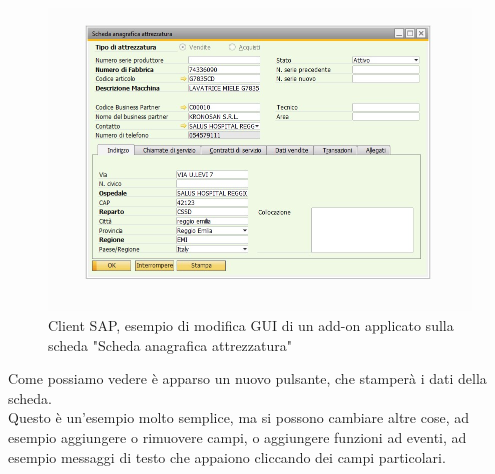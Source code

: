 \pagebreak
\begin{figure}[!h] 
	\centering 
	\includegraphics[scale = 0.6]{immagini/esempio-modifica-client-addon.jpg} 
	\caption {Client SAP, esempio di modifica GUI di un add-on applicato sulla scheda "Scheda anagrafica attrezzatura"}
\end{figure}
\begin{flushleft}
	\item Come possiamo vedere è apparso un nuovo pulsante, che stamperà i dati della scheda.\\Questo è un'esempio molto semplice, ma si possono cambiare altre cose, ad esempio aggiungere o rimuovere campi, o aggiungere funzioni ad eventi, ad esempio messaggi di testo che appaiono cliccando dei campi particolari.
\end{flushleft}
\newpage
